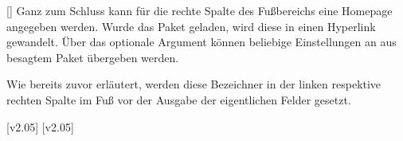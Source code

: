 \begin{Bundle*}[v2.05]{}
\begin{Declaration}{[]}
\printdeclarationlist%
%
Ganz zum Schluss kann für die rechte Spalte des Fußbereichs eine Homepage 
angegeben werden. Wurde das Paket  geladen, wird diese in 
einen Hyperlink gewandelt. Über das optionale Argument können beliebige 
Einstellungen an  aus besagtem Paket übergeben werden.
\end{Declaration}

\begin{Declaration}{}
\begin{Declaration}{}
\begin{Declaration}{}
\printdeclarationlist%
%
Wie bereits zuvor erläutert, werden diese Bezeichner in der linken respektive 
rechten Spalte im Fuß vor der Ausgabe der eigentlichen Felder gesetzt.
\end{Declaration}
\end{Declaration}
\end{Declaration}

[v2.05]
[v2.05]
\end{Bundle*}
